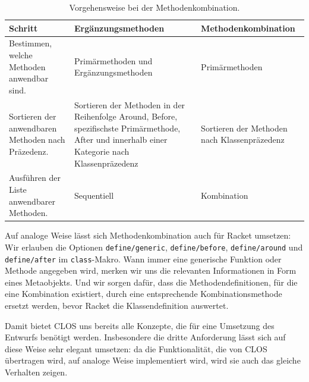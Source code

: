 \begin{table}[h]
\begin{tabular}{|p{4.7cm}|p{4.5cm}|p{4.5cm}|}
 \hline
 \textbf{Schritt} & \textbf{Ergänzungsmethoden} & \textbf{Methodenkombination}\\\hline
 Bestimmen, welche Methoden anwendbar sind. & Primärmethoden und Ergänzungsmethoden & Primärmethoden \\\hline
 Sortieren der anwendbaren Methoden nach Präzedenz. & Sortieren der Methoden in der Reihenfolge Around, Before, spezifischste Primärmethode, After und innerhalb einer Kategorie nach Klassenpräzedenz & Sortieren der Methoden nach Klassenpräzedenz\\\hline
 Ausführen der Liste anwendbarer Methoden. & Sequentiell & Kombination\\\hline
\end{tabular}
 \caption{Vorgehensweise bei der Methodenkombination.}
 \label{combination}
\end{table}

Auf analoge Weise lässt sich Methodenkombination auch für Racket umsetzen: 
Wir erlauben die Optionen \texttt{define/generic}, \texttt{define/before}, \texttt{define/around} und \texttt{define/after} im \texttt{class}-Makro. Wann immer eine generische Funktion oder Methode angegeben wird, merken wir uns die relevanten Informationen in Form eines Metaobjekts. Und wir sorgen dafür, dass die Methodendefinitionen, für die eine Kombination existiert, durch eine entsprechende Kombinationsmethode ersetzt werden, bevor Racket die Klassendefinition auswertet.

Damit bietet CLOS uns bereits alle Konzepte, die für eine Umsetzung des Entwurfs benötigt werden. Insbesondere die dritte Anforderung lässt sich auf diese Weise sehr elegant umsetzen: da die Funktionalität, die von CLOS übertragen wird, auf analoge Weise implementiert wird, wird sie auch das gleiche Verhalten zeigen.